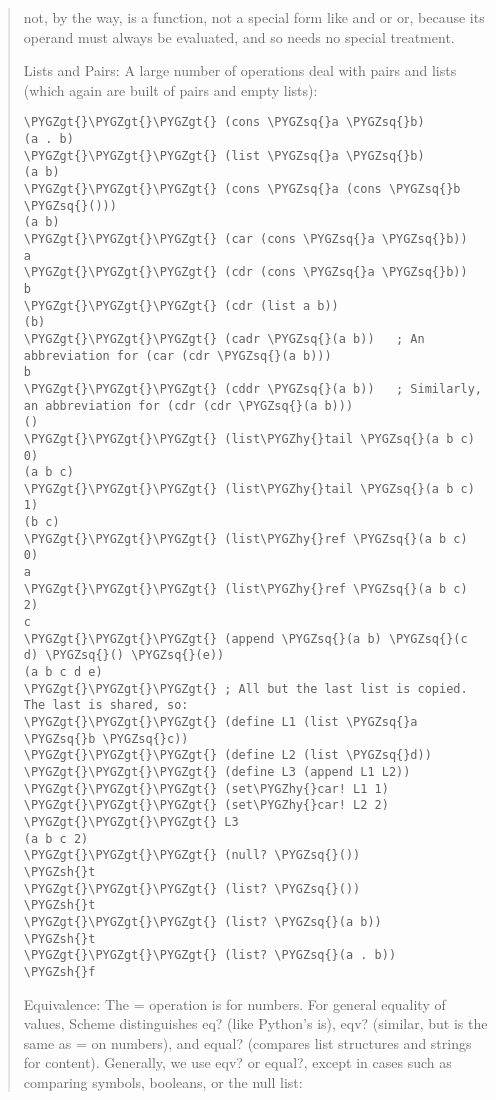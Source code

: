\documentclass[letterpaper,10pt,dvipdfmx]{sphinxmanual}
\def\PYGZgt{\char`\>}
\def\PYGZsh{\char`\#}
\def\PYGZhy{\char`\-}
\def\PYGZsq{\char`\'}
\renewcommand\PYGZsq{\textquotesingle}
\begin{document}
\begin{quote}
not, by the way, is a function, not a special form like and or or, because its operand must always be evaluated, and so needs no special treatment.

Lists and Pairs: A large number of operations deal with pairs and lists (which again are built of pairs and empty lists):

\begin{Verbatim}[commandchars=\\\{\}]
\PYGZgt{}\PYGZgt{}\PYGZgt{} (cons \PYGZsq{}a \PYGZsq{}b)
(a . b)
\PYGZgt{}\PYGZgt{}\PYGZgt{} (list \PYGZsq{}a \PYGZsq{}b)
(a b)
\PYGZgt{}\PYGZgt{}\PYGZgt{} (cons \PYGZsq{}a (cons \PYGZsq{}b \PYGZsq{}()))
(a b)
\PYGZgt{}\PYGZgt{}\PYGZgt{} (car (cons \PYGZsq{}a \PYGZsq{}b))
a
\PYGZgt{}\PYGZgt{}\PYGZgt{} (cdr (cons \PYGZsq{}a \PYGZsq{}b))
b
\PYGZgt{}\PYGZgt{}\PYGZgt{} (cdr (list a b))
(b)
\PYGZgt{}\PYGZgt{}\PYGZgt{} (cadr \PYGZsq{}(a b))   ; An abbreviation for (car (cdr \PYGZsq{}(a b)))
b
\PYGZgt{}\PYGZgt{}\PYGZgt{} (cddr \PYGZsq{}(a b))   ; Similarly, an abbreviation for (cdr (cdr \PYGZsq{}(a b)))
()
\PYGZgt{}\PYGZgt{}\PYGZgt{} (list\PYGZhy{}tail \PYGZsq{}(a b c) 0)
(a b c)
\PYGZgt{}\PYGZgt{}\PYGZgt{} (list\PYGZhy{}tail \PYGZsq{}(a b c) 1)
(b c)
\PYGZgt{}\PYGZgt{}\PYGZgt{} (list\PYGZhy{}ref \PYGZsq{}(a b c) 0)
a
\PYGZgt{}\PYGZgt{}\PYGZgt{} (list\PYGZhy{}ref \PYGZsq{}(a b c) 2)
c
\PYGZgt{}\PYGZgt{}\PYGZgt{} (append \PYGZsq{}(a b) \PYGZsq{}(c d) \PYGZsq{}() \PYGZsq{}(e))
(a b c d e)
\PYGZgt{}\PYGZgt{}\PYGZgt{} ; All but the last list is copied.  The last is shared, so:
\PYGZgt{}\PYGZgt{}\PYGZgt{} (define L1 (list \PYGZsq{}a \PYGZsq{}b \PYGZsq{}c))
\PYGZgt{}\PYGZgt{}\PYGZgt{} (define L2 (list \PYGZsq{}d))
\PYGZgt{}\PYGZgt{}\PYGZgt{} (define L3 (append L1 L2))
\PYGZgt{}\PYGZgt{}\PYGZgt{} (set\PYGZhy{}car! L1 1)
\PYGZgt{}\PYGZgt{}\PYGZgt{} (set\PYGZhy{}car! L2 2)
\PYGZgt{}\PYGZgt{}\PYGZgt{} L3
(a b c 2)
\PYGZgt{}\PYGZgt{}\PYGZgt{} (null? \PYGZsq{}())
\PYGZsh{}t
\PYGZgt{}\PYGZgt{}\PYGZgt{} (list? \PYGZsq{}())
\PYGZsh{}t
\PYGZgt{}\PYGZgt{}\PYGZgt{} (list? \PYGZsq{}(a b))
\PYGZsh{}t
\PYGZgt{}\PYGZgt{}\PYGZgt{} (list? \PYGZsq{}(a . b))
\PYGZsh{}f
\end{Verbatim}

Equivalence: The = operation is for numbers. For general equality of values, Scheme distinguishes eq? (like Python's is), eqv? (similar, but is the same as = on numbers), and equal? (compares list structures and strings for content). Generally, we use eqv? or equal?, except in cases such as comparing symbols, booleans, or the null list:


\end{quote}
\end{document}
